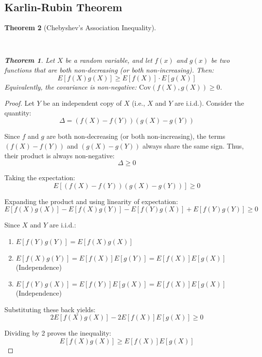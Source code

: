 \documentclass[
  letterpaper,
  DIV=11,
  numbers=noendperiod]{scrreprt}
\providecommand{\tightlist}{%
  \setlength{\itemsep}{0pt}\setlength{\parskip}{0pt}}
\renewcommand{\[}{\begin{equation}}
\renewcommand{\]}{\end{equation}}
\theoremstyle{definition}
\theoremstyle{plain}
\theoremstyle{plain}
\theoremstyle{plain}
\newtheorem{theorem}{Theorem}[chapter]
\theoremstyle{definition}
\theoremstyle{plain}
\theoremstyle{remark}
\begin{document}
\subsection{Karlin-Rubin Theorem}\label{karlin-rubin-theorem}

\begin{theorem}[Chebyshev's Association
Inequality]\protect\hypertarget{thm-chebyshev-covariance}{}\label{thm-chebyshev-covariance}

~

\begin{theorem}

Let \(X\) be a random variable, and let \(f(x)\) and \(g(x)\) be two
functions that are both non-decreasing (or both non-increasing). Then:
\[
E[f(X)g(X)] \ge E[f(X)] \cdot E[g(X)]
\] Equivalently, the covariance is non-negative:
\(\text{Cov}(f(X), g(X)) \ge 0\).

\end{theorem}

\end{theorem}

\begin{proof}
Let \(Y\) be an independent copy of \(X\) (i.e., \(X\) and \(Y\) are
i.i.d.). Consider the quantity: \[
\Delta = (f(X) - f(Y))(g(X) - g(Y))
\]

Since \(f\) and \(g\) are both non-decreasing (or both non-increasing),
the terms \((f(X) - f(Y))\) and \((g(X) - g(Y))\) always share the same
sign. Thus, their product is always non-negative: \[
\Delta \ge 0
\]

Taking the expectation: \[
E[(f(X) - f(Y))(g(X) - g(Y))] \ge 0
\]

Expanding the product and using linearity of expectation: \[
E[f(X)g(X)] - E[f(X)g(Y)] - E[f(Y)g(X)] + E[f(Y)g(Y)] \ge 0
\]

Since \(X\) and \(Y\) are i.i.d.:

\begin{enumerate}
\def\labelenumi{\arabic{enumi}.}
\tightlist
\item
  \(E[f(Y)g(Y)] = E[f(X)g(X)]\)
\item
  \(E[f(X)g(Y)] = E[f(X)]E[g(Y)] = E[f(X)]E[g(X)]\) (Independence)
\item
  \(E[f(Y)g(X)] = E[f(Y)]E[g(X)] = E[f(X)]E[g(X)]\) (Independence)
\end{enumerate}

Substituting these back yields: \[
2E[f(X)g(X)] - 2E[f(X)]E[g(X)] \ge 0
\]

Dividing by 2 proves the inequality: \[
E[f(X)g(X)] \ge E[f(X)]E[g(X)]
\]
\end{proof}
\end{document}
